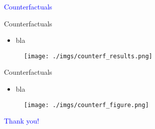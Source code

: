 \documentclass[notes,11pt, aspectratio=169]{beamer}
\begin{document}
\begin{frame}
    \textcolor{blue}{\huge{\centerline{Counterfactuals}}}
\end{frame}

\begin{frame}{Counterfactuals}
    \vspace{0.5cm}
      \begin{itemize}
        \item  bla
      \end{itemize}
      
        \begin{figure}[t*]
          \centering
    
          \texttt{[image: ./imgs/counterf\_results.png]}
        \end{figure}
        
      \end{frame}

\begin{frame}{Counterfactuals}
    \vspace{0.5cm}
      \begin{itemize}
        \item  bla
      \end{itemize}
      
        \begin{figure}[t*]
          \centering
    
          \texttt{[image: ./imgs/counterf\_figure.png]}
        \end{figure}
        
      \end{frame}


\begin{frame}
\textcolor{blue}{\huge{\centerline{Thank you!}}}
\end{frame}

%    
%    


\appendix
\end{document}
